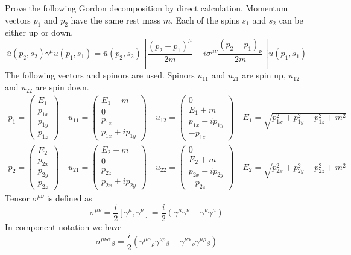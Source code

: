 \documentclass[12pt]{article}
\begin{document}
\noindent
Prove the following Gordon decomposition by direct calculation.
Momentum vectors $p_1$ and $p_2$ have the same rest mass $m$.
Each of the spins $s_1$ and $s_2$ can be either up or down.
$$
\bar{u}(p_2,s_2)\gamma^\mu u(p_1,s_1)=
\bar{u}(p_2,s_2)
\left[
\frac{(p_2+p_1)^\mu}{2m}+i\sigma^{\mu\nu}\frac{(p_2-p_1)_\nu}{2m}
\right]
u(p_1,s_1)
$$
The following vectors and spinors are used.
Spinors $u_{11}$ and $u_{21}$ are spin up, $u_{12}$ and $u_{22}$ are spin down.
\begin{gather*}
p_1=\begin{pmatrix}E_1\\p_{1x}\\p_{1y}\\p_{1z}\end{pmatrix}\quad
u_{11}=\begin{pmatrix}E_1+m\\0\\p_{1z}\\p_{1x}+ip_{1y}\end{pmatrix}\quad
u_{12}=\begin{pmatrix}0\\E_1+m\\p_{1x}-ip_{1y}\\-p_{1z}\end{pmatrix}\quad
E_1=\sqrt{p_{1x}^2+p_{1y}^2+p_{1z}^2+m^2}\\
p_2=\begin{pmatrix}E_2\\p_{2x}\\p_{2y}\\p_{2z}\end{pmatrix}\quad
u_{21}=\begin{pmatrix}E_2+m\\0\\p_{2z}\\p_{2x}+ip_{2y}\end{pmatrix}\quad
u_{22}=\begin{pmatrix}0\\E_2+m\\p_{2x}-ip_{2y}\\-p_{2z}\end{pmatrix}\quad
E_2=\sqrt{p_{2x}^2+p_{2y}^2+p_{2z}^2+m^2}
\end{gather*}
Tensor $\sigma^{\mu\nu}$ is defined as
$$
\sigma^{\mu\nu}=\frac{i}{2}\left[\gamma^\mu,\gamma^\nu\right]
=\frac{i}{2}\left(\gamma^\mu\gamma^\nu-\gamma^\nu\gamma^\mu\right)
$$
In component notation we have
$$
\sigma^{\mu\nu\alpha}{}_\beta
=\frac{i}{2}\left(\gamma^{\mu\alpha}{}_\rho\gamma^{\nu\rho}{}_\beta
-\gamma^{\nu\alpha}{}_\rho\gamma^{\mu\rho}{}_\beta\right)
$$
\end{document}

